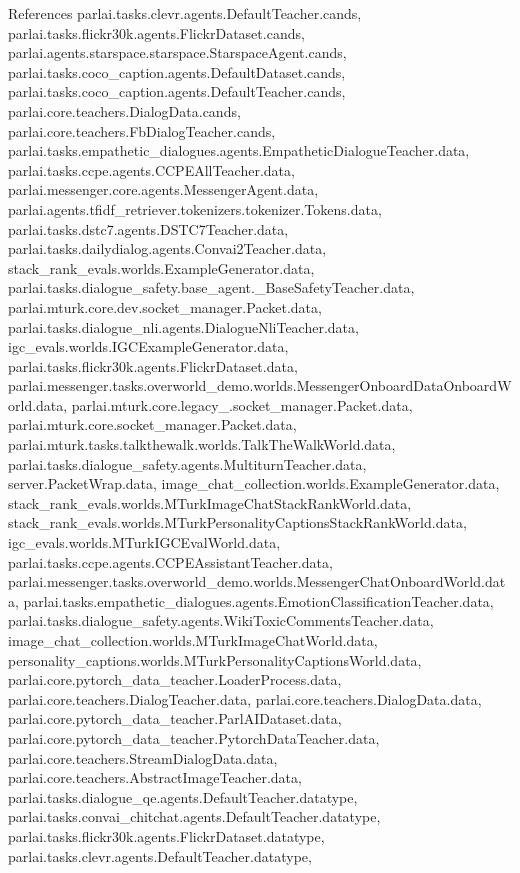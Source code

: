 References parlai.\+tasks.\+clevr.\+agents.\+Default\+Teacher.\+cands, parlai.\+tasks.\+flickr30k.\+agents.\+Flickr\+Dataset.\+cands, parlai.\+agents.\+starspace.\+starspace.\+Starspace\+Agent.\+cands, parlai.\+tasks.\+coco\+\_\+caption.\+agents.\+Default\+Dataset.\+cands, parlai.\+tasks.\+coco\+\_\+caption.\+agents.\+Default\+Teacher.\+cands, parlai.\+core.\+teachers.\+Dialog\+Data.\+cands, parlai.\+core.\+teachers.\+Fb\+Dialog\+Teacher.\+cands, parlai.\+tasks.\+empathetic\+\_\+dialogues.\+agents.\+Empathetic\+Dialogue\+Teacher.\+data, parlai.\+tasks.\+ccpe.\+agents.\+C\+C\+P\+E\+All\+Teacher.\+data, parlai.\+messenger.\+core.\+agents.\+Messenger\+Agent.\+data, parlai.\+agents.\+tfidf\+\_\+retriever.\+tokenizers.\+tokenizer.\+Tokens.\+data, parlai.\+tasks.\+dstc7.\+agents.\+D\+S\+T\+C7\+Teacher.\+data, parlai.\+tasks.\+dailydialog.\+agents.\+Convai2\+Teacher.\+data, stack\+\_\+rank\+\_\+evals.\+worlds.\+Example\+Generator.\+data, parlai.\+tasks.\+dialogue\+\_\+safety.\+base\+\_\+agent.\+\_\+\+Base\+Safety\+Teacher.\+data, parlai.\+mturk.\+core.\+dev.\+socket\+\_\+manager.\+Packet.\+data, parlai.\+tasks.\+dialogue\+\_\+nli.\+agents.\+Dialogue\+Nli\+Teacher.\+data, igc\+\_\+evals.\+worlds.\+I\+G\+C\+Example\+Generator.\+data, parlai.\+tasks.\+flickr30k.\+agents.\+Flickr\+Dataset.\+data, parlai.\+messenger.\+tasks.\+overworld\+\_\+demo.\+worlds.\+Messenger\+Onboard\+Data\+Onboard\+World.\+data, parlai.\+mturk.\+core.\+legacy\+\_.\+socket\+\_\+manager.\+Packet.\+data, parlai.\+mturk.\+core.\+socket\+\_\+manager.\+Packet.\+data, parlai.\+mturk.\+tasks.\+talkthewalk.\+worlds.\+Talk\+The\+Walk\+World.\+data, parlai.\+tasks.\+dialogue\+\_\+safety.\+agents.\+Multiturn\+Teacher.\+data, server.\+Packet\+Wrap.\+data, image\+\_\+chat\+\_\+collection.\+worlds.\+Example\+Generator.\+data, stack\+\_\+rank\+\_\+evals.\+worlds.\+M\+Turk\+Image\+Chat\+Stack\+Rank\+World.\+data, stack\+\_\+rank\+\_\+evals.\+worlds.\+M\+Turk\+Personality\+Captions\+Stack\+Rank\+World.\+data, igc\+\_\+evals.\+worlds.\+M\+Turk\+I\+G\+C\+Eval\+World.\+data, parlai.\+tasks.\+ccpe.\+agents.\+C\+C\+P\+E\+Assistant\+Teacher.\+data, parlai.\+messenger.\+tasks.\+overworld\+\_\+demo.\+worlds.\+Messenger\+Chat\+Onboard\+World.\+data, parlai.\+tasks.\+empathetic\+\_\+dialogues.\+agents.\+Emotion\+Classification\+Teacher.\+data, parlai.\+tasks.\+dialogue\+\_\+safety.\+agents.\+Wiki\+Toxic\+Comments\+Teacher.\+data, image\+\_\+chat\+\_\+collection.\+worlds.\+M\+Turk\+Image\+Chat\+World.\+data, personality\+\_\+captions.\+worlds.\+M\+Turk\+Personality\+Captions\+World.\+data, parlai.\+core.\+pytorch\+\_\+data\+\_\+teacher.\+Loader\+Process.\+data, parlai.\+core.\+teachers.\+Dialog\+Teacher.\+data, parlai.\+core.\+teachers.\+Dialog\+Data.\+data, parlai.\+core.\+pytorch\+\_\+data\+\_\+teacher.\+Parl\+A\+I\+Dataset.\+data, parlai.\+core.\+pytorch\+\_\+data\+\_\+teacher.\+Pytorch\+Data\+Teacher.\+data, parlai.\+core.\+teachers.\+Stream\+Dialog\+Data.\+data, parlai.\+core.\+teachers.\+Abstract\+Image\+Teacher.\+data, parlai.\+tasks.\+dialogue\+\_\+qe.\+agents.\+Default\+Teacher.\+datatype, parlai.\+tasks.\+convai\+\_\+chitchat.\+agents.\+Default\+Teacher.\+datatype, parlai.\+tasks.\+flickr30k.\+agents.\+Flickr\+Dataset.\+datatype, parlai.\+tasks.\+clevr.\+agents.\+Default\+Teacher.\+datatype, 